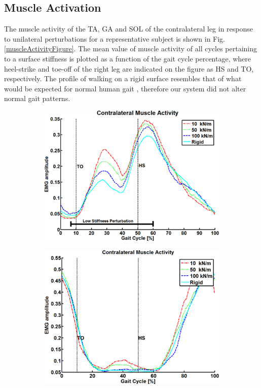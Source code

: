 \subsection{Muscle Activation}
The muscle activity of the TA, GA and SOL of the contralateral leg in response to unilateral perturbations for a representative subject is shown in Fig. \ref{muscleActivityFigure}.  The mean value of muscle activity of all cycles pertaining to a surface stiffness is plotted as a function of the gait cycle percentage, where heel-strike and toe-off of the right leg are indicated on the figure as HS and TO, respectively.  The profile of walking on a rigid surface resembles that of what would be expected for normal human gait \cite{Perry_1992_Gait}, therefore our system did not alter normal gait patterns.

\begin{figure}
\centering
\begin{subfigure}{1.0\columnwidth}
	\centering
	\includegraphics[width=.9\columnwidth]{Figures/TA_all_mean}
	\caption{  }
	\label{taAllMean}
\end{subfigure}

\vspace{3 mm}

\begin{subfigure}{1.0\columnwidth}
	\centering
	\includegraphics[width=.9\columnwidth]{Figures/GA_all_mean}
	\caption{}
	\label{gaAllMean}
\end{subfigure}


\end{figure}
